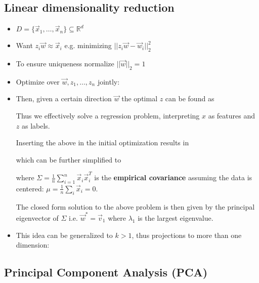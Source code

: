 \documentclass[8pt,a4paper]{scrartcl}
\begin{document}
\begin{multicols*}{3}
\subsection{Linear dimensionality reduction}

\begin{itemize}
\ncompaq
\item $D=\{\vec{x}_1,\ldots,\vec{x}_n\}\subseteq\mathbb{R}^d$
\item Want $z_i\vec{w}\approx\vec{x}_i$ e.g. minimizing $||z_i\vec{w}-\vec{w}_i||_2^2$
\item To ensure uniqueness normalize $||\vec{w}||_2 = 1$
\item Optimize over $\vec{w},z_1,\ldots,z_n$ jointly:

\item Then, given a certain direction $\vec{w}$ the optimal $z$ can be found as


Thus we effectively solve a regression problem, interpreting $x$ as features and $z$ as labels.

Inserting the above in the initial optimization results in


which can be further simplified to


where $\Sigma=\frac{1}{n}\sum\limits_{i=1}^n\vec{x}_i\vec{x}_i^T$ is the \textbf{empirical covariance} assuming the data is centered: $\mu=\frac{1}{n}\sum\limits_i \vec{x}_i=0$.

\vspace{3ex}

The closed form solution to the above problem is then given by the principal eigenvector of $\Sigma$ i.e. $\vec{w}^\ast=\vec{v}_1$ where $\lambda_1$ is the largest eigenvalue.
\item This idea can be generalized to $k>1$, thus projections to more than one dimension:
\end{itemize}

\subsection{Principal Component Analysis (PCA)}


\end{multicols*}
\end{document}
